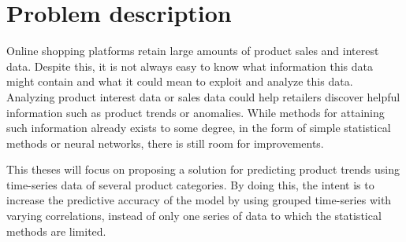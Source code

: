 
\section{Problem description}
\label{section:Introduction:ProblemDescription}
Online shopping platforms retain large amounts of product sales and interest data.
Despite this, it is not always easy to know what information this data might contain and what it could mean to exploit and analyze this data.
Analyzing product interest data or sales data could help retailers discover helpful information such as product trends or anomalies.
While methods for attaining such information already exists to some degree, in the form of simple statistical methods or neural networks,
there is still room for improvements.


This theses will focus on proposing a solution for predicting product trends using time-series data of several product categories.
By doing this, the intent is to increase the predictive accuracy of the model by using grouped time-series with varying correlations,
instead of only one series of data to which the statistical methods are limited.



